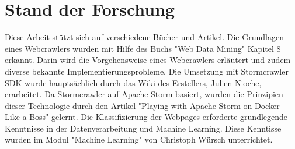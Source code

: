 \chapter{Stand der Forschung}
Diese Arbeit stützt sich auf verschiedene Bücher und Artikel.
Die Grundlagen eines Webcrawlers wurden mit Hilfe des Buchs "Web Data Mining" Kapitel 8 erkannt. %
Darin wird die Vorgehensweise eines Webcrawlers erläutert und zudem diverse bekannte Implementierungsprobleme.
Die Umsetzung mit Stormcrawler SDK wurde hauptsächlich durch das Wiki des Erstellers, Julien Nioche, erarbeitet. %
Da Stormcrawler auf Apache Storm basiert, wurden die Prinzipien dieser Technologie durch den Artikel "Playing with Apache Storm on Docker - Like a Boss" gelernt. %
Die Klassifizierung der Webpages erforderte grundlegende Kenntnisse in der Datenverarbeitung und Machine Learning.
Diese Kenntisse wurden im Modul "Machine Learning" von Christoph Würsch unterrichtet. %

